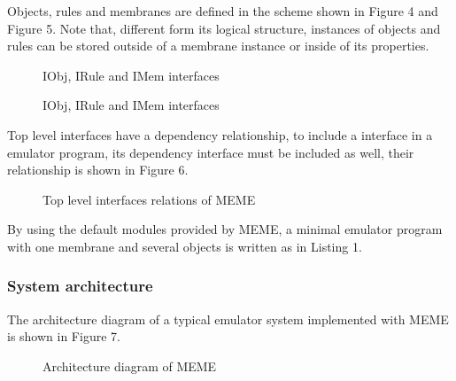 \documentclass[9pt,a4paper,twoside]{article}
\newcommand\figpath{./paper/assets/figures/}
\newcommand\codepath{./paper/src/codes/}
\begin{document}
        Objects, rules and membranes are defined in the scheme shown in Figure 4 and Figure 5. Note that, different form its logical structure, instances of objects and rules 
        can be stored outside of a membrane instance or inside of its properties.
        \begin{figure}[!htbp]
            \centering
            
            \caption{IObj, IRule and IMem interfaces}
            \label{fig:fig4}
        \end{figure}
        \begin{figure}[!htbp]
            \centering
            
            \caption{IObj, IRule and IMem interfaces}
            \label{fig:fig5}
        \end{figure}

        Top level interfaces have a dependency relationship, to include a interface in a emulator program, its dependency interface must be included as well,
        their relationship is shown in Figure 6.
        \begin{figure}[!htbp]
            \centering
            
            \caption{Top level interfaces relations of MEME}
            \label{fig:fig6}
        \end{figure}

        By using the default modules provided by MEME, a minimal emulator program with one membrane and several objects is written as in 
        Listing 1.
        
        \begin{minipage}{\textwidth}
            \centering
            
        \end{minipage}

        \subsubsection{System architecture}
        The architecture diagram of a typical emulator system implemented with MEME is shown in Figure 7.
        \begin{figure}[!htbp]
            \centering
            
            \caption{Architecture diagram of MEME}
            \label{fig:fig7}
        \end{figure}
\end{document}
